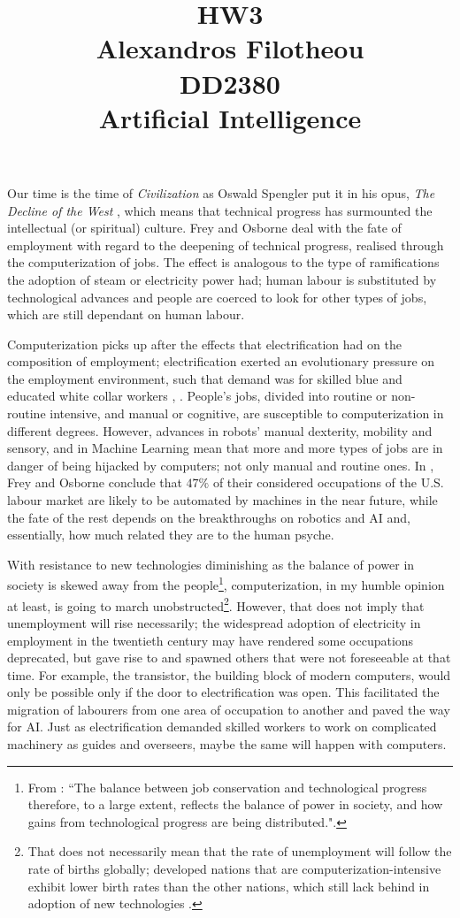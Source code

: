 \documentclass[12pt]{article}
\title{HW3 \\ Alexandros Filotheou \\ DD2380 \\ Artificial Intelligence}
\date{}
\begin{document}
  \maketitle
  
Our time is the time of \textit{Civilization} as Oswald Spengler put it in his opus, \textit{The Decline of the West} \cite{TDotW}, which means that technical progress has surmounted the intellectual (or spiritual) culture. Frey and Osborne \cite{TFoE} deal with the fate of employment with regard to the deepening of technical progress, realised through the computerization of jobs. The effect is analogous to the type of ramifications the adoption of steam or electricity power had; human labour is substituted by technological advances and people are coerced to look for other types of jobs, which are still dependant on human labour. 

Computerization picks up after the effects that electrification had on the composition of employment; electrification exerted an evolutionary pressure on the employment environment, such that demand was for skilled blue and educated white collar workers \cite{TOoTc}, \cite{Allen}. People's jobs, divided into routine or non-routine intensive, and manual or cognitive, are susceptible to computerization in different degrees. However, advances in robots' manual dexterity, mobility and sensory, and in Machine Learning mean that more and more types of jobs are in danger of being hijacked by computers; not only manual and routine ones. In \cite{TFoE}, Frey and Osborne conclude that $47\%$ of their considered occupations of the U.S. labour market are likely to be automated by machines in the near future, while the fate of the rest depends on the breakthroughs on robotics and AI and, essentially, how much related they are to the human psyche.

With resistance to new technologies diminishing as the balance of power in society is skewed away from the people\footnote{From \cite{TFoE}: ``The balance between job conservation and technological progress therefore, to a large extent, reflects the balance of power in society, and how gains from technological progress are being distributed.".}, computerization, in my humble opinion at least, is going to march unobstructed\footnote{That does not necessarily mean that the rate of unemployment will follow the rate of births globally; developed nations that are computerization-intensive exhibit lower birth rates than the other nations, which still lack behind in adoption of new technologies \cite{DCFR}.}. However, that does not imply that unemployment will rise necessarily; the widespread adoption of electricity in employment in the twentieth century may have rendered some occupations deprecated, but gave rise to and spawned others that were not foreseeable at that time. For example, the transistor, the building block of modern computers, would only be possible only if the door to electrification was open. This facilitated the migration of labourers from one area of occupation to another and paved the way for AI. Just as electrification demanded skilled workers to work on complicated machinery as guides and overseers, maybe the same will happen with computers. 
\end{document}
